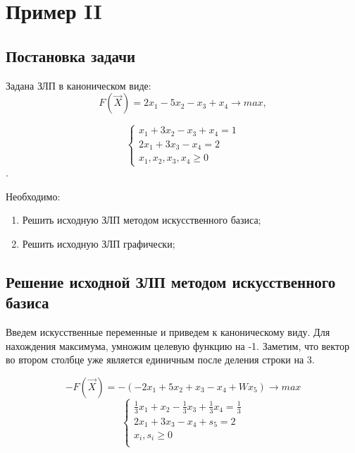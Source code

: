 \section{Пример II}

\subsection{Постановка задачи}
\renewcommand{\labelenumi}{\arabic{enumi})}
Задана ЗЛП в каноническом виде:
\begin{equation}
	F(\vec{X}) = 2x_1 - 5x_2 - x_3 + x_4 \to max,
\end{equation}

\begin{equation}
\begin{cases}
x_1 + 3x_2 - x_3 + x_4 = 1 \\
2x_1 + 3x_3 - x_4 = 2 \\
x_1, x_2, x_3, x_4 \ge 0
\end{cases}
\end{equation}.

Необходимо:
\begin{enumerate}
\item Решить исходную ЗЛП методом искусственного базиса;
\item Решить исходную ЗЛП графически;
\end{enumerate}

\subsection{Решение исходной ЗЛП методом искусственного базиса}
Введем искусственные переменные и приведем к каноническому виду.
Для нахождения максимума, умножим целевую функцию на -1.
Заметим, что вектор во втором столбце уже является
единичным после деления строки на 3.

$$-F(\vec{X}) = -(-2x_1+5x_2+x_3-x_4+Wx_5) \to max$$
\begin{equation}
\label{cannonical}
\begin{cases}
\frac{1}{3} x_1+x_2 - \frac{1}{3} x_3 + \frac{1}{3} x_4=\frac{1}{3} \\
2x_1+3x_3-x_4+ s_5=2\\
x_i, s_i \ge 0 \\
\end{cases}
\end{equation}

